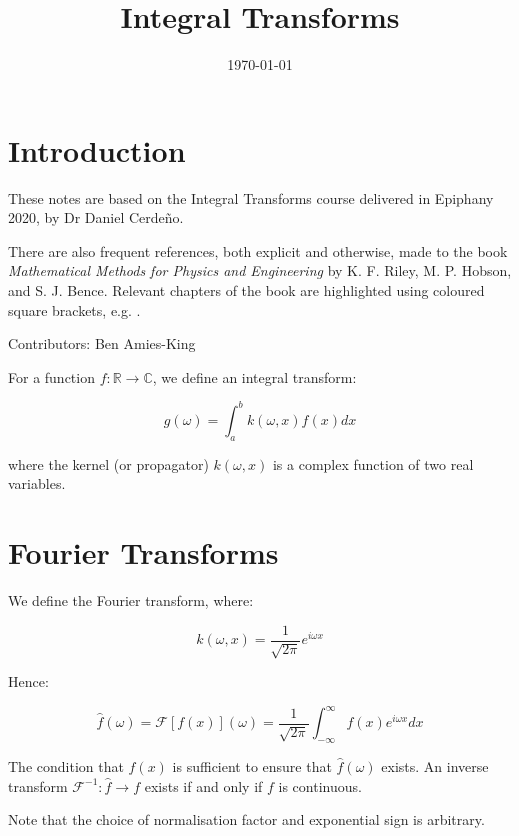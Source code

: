 \documentclass{../../physics_notes}
\title{Integral Transforms}
\date{\today}
\begin{document}
\maketitle
\tableofcontents
\newpage

\section*{Introduction}

These notes are based on the Integral Transforms course delivered in Epiphany 2020, by Dr Daniel Cerdeño. 

There are also frequent references, both explicit and otherwise, made to the book \emph{Mathematical Methods for Physics and Engineering} by K. F. Riley, M. P. Hobson, and S. J. Bence. Relevant chapters of the book are highlighted using coloured square brackets, e.g. .

Contributors: Ben Amies-King

For a function $f: \mathbb{R} \rightarrow \mathbb{C}$, we define an integral transform:

\begin{equation}
g(\omega) = \int_a^b k(\omega, x) f(x) dx
\end{equation}

where the kernel (or propagator) $k(\omega, x)$ is a complex function of two real variables. 

\section{Fourier Transforms}

We define the Fourier transform, where:

\begin{equation*}
k(\omega, x) = \frac{1}{\sqrt{2\pi}} e^{i\omega x}
\end{equation*}

Hence:

\begin{equation}
\hat{f}(\omega) = \mathcal{F}[f(x)](\omega) = \frac{1}{\sqrt{2\pi}}\int_{-\infty}^\infty f(x) e^{i\omega x} dx
\end{equation}

The condition that $f(x)$ is sufficient to ensure that $\hat{f}(\omega)$ exists. An inverse transform $\mathcal{F}^{-1}: \hat{f} \rightarrow f$ exists if and only if $f$ is continuous. 

Note that the choice of normalisation factor and exponential sign is arbitrary. 
\end{document}

